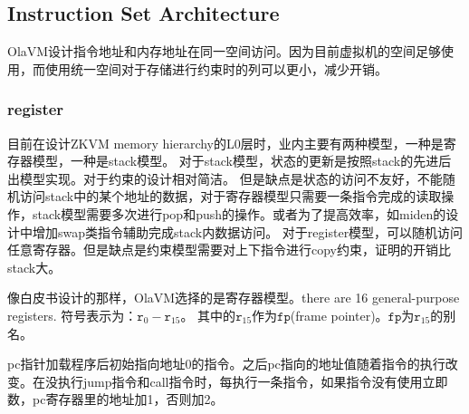 \subsection{Instruction Set Architecture}\label{subsec: processor-instructions-executor}
OlaVM设计指令地址和内存地址在同一空间访问。因为目前虚拟机的空间足够使用，而使用统一空间对于存储进行约束时的列可以更小，减少开销。

\subsubsection{register}\label{subsec: processor-register}
目前在设计ZKVM memory hierarchy的L0层时，业内主要有两种模型，一种是寄存器模型，一种是stack模型。
对于stack模型，状态的更新是按照stack的先进后出模型实现。对于约束的设计相对简洁。
但是缺点是状态的访问不友好，不能随机访问stack中的某个地址的数据，对于寄存器模型只需要一条指令完成的读取操作，stack模型需要多次进行pop和push的操作。或者为了提高效率，如miden的设计中增加swap类指令辅助完成stack内数据访问。
对于register模型，可以随机访问任意寄存器。但是缺点是约束模型需要对上下指令进行copy约束，证明的开销比stack大。

像白皮书设计的那样，OlaVM选择的是寄存器模型。there are 16 general-purpose registers.
符号表示为：$\texttt{r}_0 - \texttt{r}_{15}$。
其中的$\texttt{r}_{15}$作为$\texttt{fp}$(frame pointer)。$\texttt{fp}$为$\texttt{r}_{15}$的别名。

pc指针加载程序后初始指向地址0的指令。之后pc指向的地址值随着指令的执行改变。在没执行jump指令和call指令时，每执行一条指令，如果指令没有使用立即数，pc寄存器里的地址加1，否则加2。

